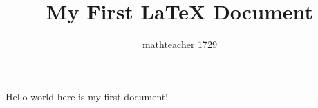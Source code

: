 \documentclass{article}
\begin{document}
\title{My First \LaTeX{} Document}
\author{mathteacher 1729}
\maketitle

Hello world here is my first document!
\end{document}
